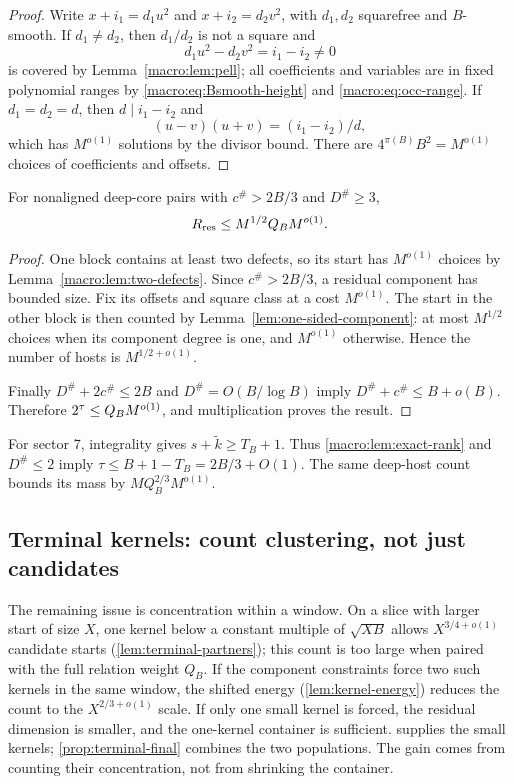 \begin{proof}
Write
$x+i_1=d_1u^2$ and $x+i_2=d_2v^2$, with $d_1,d_2$ squarefree and
$B$-smooth.  If $d_1\neq d_2$, then $d_1/d_2$ is not a square and
\[
 d_1u^2-d_2v^2=i_1-i_2\neq0
\]
is covered by Lemma~\ref{macro:lem:pell}; all coefficients and variables are
in fixed polynomial ranges by \eqref{macro:eq:Bsmooth-height} and
\eqref{macro:eq:occ-range}.  If $d_1=d_2=d$, then $d\mid i_1-i_2$ and
\[
 (u-v)(u+v)=(i_1-i_2)/d,
\]
which has $M^{o(1)}$ solutions by the divisor bound.  There are
$4^{\pi(B)}B^2=M^{o(1)}$ choices of coefficients and offsets.
\end{proof}
\begin{proposition}[Sector 6]\label{macro:prop:sector6}
For nonaligned deep-core pairs with $c^\#>2B/3$ and $D^\#\geq3$,
\[
 R_{\rm res}\leq M^{1/2}Q_B M^{o(1)}.
\]
\end{proposition}

\begin{proof}
One block contains at least two defects, so its start has
$M^{o(1)}$ choices by Lemma~\ref{macro:lem:two-defects}.  Since
$c^\#>2B/3$, a residual component has bounded size.  Fix its offsets
and square class at a cost $M^{o(1)}$.  The start in the other block is
then counted by Lemma~\ref{lem:one-sided-component}: at most $M^{1/2}$ choices
when its component degree is one, and $M^{o(1)}$ otherwise.  Hence the
number of hosts is $M^{1/2+o(1)}$.

Finally $D^\#+2c^\#\leq2B$ and
$D^\#=O(B/\log B)$ imply
$D^\#+c^\#\leq B+o(B)$.  Therefore
$2^\tau\leq Q_B M^{o(1)}$, and multiplication proves the result.
\end{proof}
For sector 7, integrality gives $s+\widetilde k\ge T_B+1$.
Thus \eqref{macro:lem:exact-rank} and $D^\#\le2$ imply
$\tau\le B+1-T_B=2B/3+O(1)$. The same deep-host count bounds its mass
by $MQ_B^{2/3}M^{o(1)}$.

\subsection{Terminal kernels: count clustering, not just candidates}

The remaining issue is concentration within a window. On a slice with
larger start of size $X$, one kernel below a constant multiple of
$\sqrt{XB}$ allows $X^{3/4+o(1)}$ candidate starts
(\cref{lem:terminal-partners}); this count is too large when paired with
the full relation weight $Q_B$. If the component constraints force two
such kernels in the same window, the shifted energy
(\cref{lem:kernel-energy}) reduces the count to the
$X^{2/3+o(1)}$ scale. If only one small kernel is forced, the residual
dimension is smaller, and the one-kernel container is sufficient.
 supplies the small kernels;
\cref{prop:terminal-final} combines the two populations. The gain comes
from counting their concentration, not from shrinking the container.


